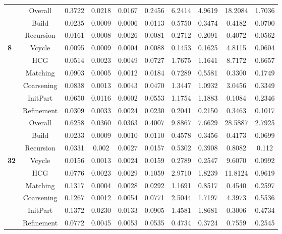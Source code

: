 \documentclass[twocolumn]{svjour3}          \smartqed
\begin{document}
\begin{table*}[t]
{\begin{threeparttable}
\begin{tabular}{|l|c|cccccccc|}
& Overall	& 0.3722 & 0.0218 & 0.0167 & 0.2456 & 6.2414 & 4.9619 & 18.2084 & 1.7036\\
			& Build		& 0.0235 & 0.0009 & 0.0006 & 0.0113 & 0.5750 & 0.3474 & 0.4182 & 0.0700\\
			& Recursion	& 0.0161 & 0.0008 & 0.0026 & 0.0081 & 0.2712 & 0.2091 & 0.4072 & 0.0562\\
\textbf{8}
			& Vcycle		& 0.0095 & 0.0009 & 0.0004 & 0.0088 & 0.1453 & 0.1625 & 4.8115 & 0.0604\\
			& HCG	& 0.0514 & 0.0023 & 0.0049 & 0.0727 & 1.7675 & 1.1641 & 8.7172 & 0.6657\\
			& Matching	& 0.0903 & 0.0005 & 0.0012 & 0.0184 & 0.7289 & 0.5581 & 0.3300 & 0.1749\\
			& Coarsening	& 0.0838 & 0.0013 & 0.0043 & 0.0470 & 1.3447 & 1.0932 & 3.0456 & 0.3349\\
			& InitPart	& 0.0650 & 0.0116 & 0.0002 & 0.0553 & 1.1754 & 1.1883 & 0.1084 & 0.2346\\
			& Refinement	& 0.0309 & 0.0033 & 0.0024 & 0.0230 & 0.2041 & 0.2150 & 0.3463 & 0.1017\\
			\hline

& Overall	& 0.6258 & 0.0360 & 0.0363 & 0.4007 & 9.8867 & 7.6629 & 28.5887 & 2.7925\\
			& Build		& 0.0233 & 0.0009 & 0.0010 & 0.0110 & 0.4578 & 0.3456 & 0.4173 & 0.0699\\
			& Recursion	& 0.0331 & 0.002 & 0.0027 & 0.0157 & 0.5302 & 0.3908 & 0.8082 & 0.112\\
\textbf{32}
			& Vcycle		& 0.0156 & 0.0013 & 0.0024 & 0.0159 & 0.2789 & 0.2547 & 9.6070 & 0.0992\\
			& HCG	& 0.0776 & 0.0023 & 0.0029 & 0.1059 & 2.9710 & 1.8239 & 11.8124 & 0.9619\\
			& Matching	& 0.1317 & 0.0004 & 0.0028 & 0.0292 & 1.1691 & 0.8517 & 0.4540 & 0.2597\\
			& Coarsening	& 0.1267 & 0.0012 & 0.0054 & 0.0771 & 2.5044 & 1.7197 & 4.3973 & 0.5536\\
			& InitPart	& 0.1372 & 0.0230 & 0.0133 & 0.0905 & 1.4581 & 1.8681 & 0.3006 & 0.4734\\
			& Refinement	& 0.0772 & 0.0045 & 0.0053 & 0.0535 & 0.4734 & 0.3724 & 0.7559 & 0.2545\\
			\hline
			

		\end{tabular}
	\end{threeparttable}
	}	\end{table*}
\end{document}
